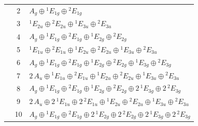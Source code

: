 \documentclass[11pt]{article}
\begin{document}
\begin{longtable}{l c p{}}
 & 2 & $A_{g}\oplus {}^{1}E_{1g}\oplus {}^{2}E_{1g}$\\
 & 3 & ${}^{1}E_{2u}\oplus {}^{2}E_{2u}\oplus {}^{1}E_{3u}\oplus {}^{2}E_{3u}$\\
 & 4 & $A_{g}\oplus {}^{1}E_{1g}\oplus {}^{2}E_{1g}\oplus {}^{1}E_{2g}\oplus {}^{2}E_{2g}$\\
 & 5 & ${}^{1}E_{1u}\oplus {}^{2}E_{1u}\oplus {}^{1}E_{2u}\oplus {}^{2}E_{2u}\oplus {}^{1}E_{3u}\oplus {}^{2}E_{3u}$\\
 & 6 & $A_{g}\oplus {}^{1}E_{1g}\oplus {}^{2}E_{1g}\oplus {}^{1}E_{2g}\oplus {}^{2}E_{2g}\oplus {}^{1}E_{3g}\oplus {}^{2}E_{3g}$\\
 & 7 & $2\,A_{u}\oplus {}^{1}E_{1u}\oplus {}^{2}E_{1u}\oplus {}^{1}E_{2u}\oplus {}^{2}E_{2u}\oplus {}^{1}E_{3u}\oplus {}^{2}E_{3u}$\\
 & 8 & $A_{g}\oplus {}^{1}E_{1g}\oplus {}^{2}E_{1g}\oplus {}^{1}E_{2g}\oplus {}^{2}E_{2g}\oplus 2\,{}^{1}E_{3g}\oplus 2\,{}^{2}E_{3g}$\\
 & 9 & $2\,A_{u}\oplus 2\,{}^{1}E_{1u}\oplus 2\,{}^{2}E_{1u}\oplus {}^{1}E_{2u}\oplus {}^{2}E_{2u}\oplus {}^{1}E_{3u}\oplus {}^{2}E_{3u}$\\
 & 10 & $A_{g}\oplus {}^{1}E_{1g}\oplus {}^{2}E_{1g}\oplus 2\,{}^{1}E_{2g}\oplus 2\,{}^{2}E_{2g}\oplus 2\,{}^{1}E_{3g}\oplus 2\,{}^{2}E_{3g}$\\
\hline
\end{longtable}
\end{document}
